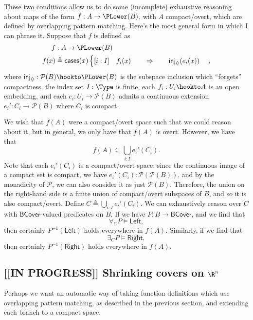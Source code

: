 These two conditions allow us to do some (incomplete) exhaustive reasoning about maps of the form $f : A \to \PLower(B)$, with $A$ compact/overt, which are defined by overlapping pattern matching. Here's the most general form in which I can phrase it. Suppose that $f$ is defined as
\begin{align*}
f &: A \to \PLower(B)
\\
f(x) &\triangleq \mathsf{cases}(x)
\begin{cases}
[i : I] \quad f_i(x) \qquad \Rightarrow \qquad \mathsf{inj}_{\lozenge}(e_i(x))
\end{cases},
\end{align*}
where $\mathsf{inj}_\lozenge : \mathcal{P}(B) \hookto \PLower(B)$ is the subspace inclusion which ``forgets'' compactness, the index set $I : \Type$ is finite, each $f_i : U_i \hookto A$ is an open embedding, and each $e_i : U_i \to \mathcal{P}(B)$ admits a continuous extension $e_i' : C_i \to \mathcal{P}(B)$ where $C_i$ is compact.

We wish that $f(A)$ were a compact/overt space such that we could reason about it, but in general, we only have that $f(A)$ is overt. However, we have that
\[
f(A) \subseteq \bigcup_{i : I} e_i'(C_i).
\]
Note that each $e_i'(C_i)$ is a compact/overt space: since the continuous image of a compact set is compact, we have $e_i'(C_i) : \mathcal{P}(\mathcal{P}(B))$, and by the monadicity of $\mathcal{P}$, we can also consider it as just $\mathcal{P}(B)$. Therefore, the union on the right-hand side is a finite union of compact/overt subspaces of $B$, and so it is also compact/overt. Define $C \triangleq \bigcup_{i : I} e_i'(C_i)$. We can exhaustively reason over $C$ with $\mathsf{BCover}$-valued predicates on $B$. If we have $P : B \to \mathsf{BCover}$, and we find that
\[
\forall_C P \models \mathsf{Left},
\]
then certainly $P^{-1}(\mathsf{Left})$ holds everywhere in $f(A)$. Similarly, if we find that
\[
\exists_C P \models \mathsf{Right},
\]
then certainly $P^{-1}(\mathsf{Right})$ holds everywhere in $f(A)$.

\subsection{[[IN PROGRESS]] Shrinking covers on $\R^n$}

Perhaps we want an automatic way of taking function definitions which use overlapping pattern matching, as described in the previous section, and extending each branch to a compact space.

